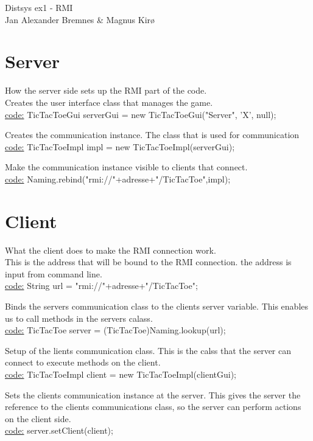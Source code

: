 \documentclass[12pt]{article}
\begin{document}
    Distsys ex1 - RMI \\
    Jan Alexander Bremnes & Magnus Kirø \\ 

\section{Server}    
        How the server side sets up the RMI part of the code. \\

        Creates the user interface class that manages the game.\\
	    \underline{code:} TicTacToeGui serverGui = new TicTacToeGui("Server", 'X', null);
			
        Creates the communication instance. The class that is used for communication \\
		\underline{code:} TicTacToeImpl impl = new TicTacToeImpl(serverGui);
		
		Make the communication instance visible to clients that connect.\\
        \underline{code:} Naming.rebind("rmi://"+adresse+"/TicTacToe",impl);
	
\section{Client}
	    What the client does to make the RMI connection work. \\
	
	    This is the address that will be bound to the RMI connection. the address is input from command line.\\
    	\underline{code:} String url = "rmi://"+adresse+"/TicTacToe"; 
    	
        Binds the servers communication class to the clients server variable. This enables us to call methods in the servers calass. \\
		\underline{code:} TicTacToe server = (TicTacToe)Naming.lookup(url);

		Setup of the lients communication class. This is the calss that the server can connect to execute methods on the client. \\
        \underline{code:} TicTacToeImpl client = new TicTacToeImpl(clientGui);

		Sets the clients communication instance at the server. This gives the server the reference to the clients communications class, so the server can perform actions on the client side. \\
        \underline{code:} server.setClient(client);
\end{document}
